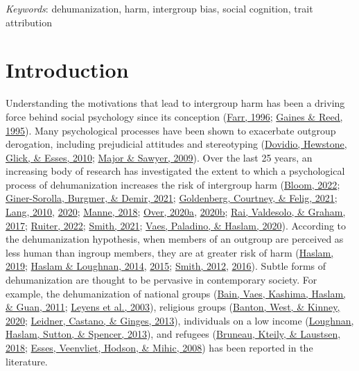 \documentclass[
]{article}
\begin{document}
\emph{Keywords}: dehumanization, harm, intergroup bias, social cognition, trait attribution

\hypertarget{introduction}{%
\section{Introduction}\label{introduction}}

Understanding the motivations that lead to intergroup harm has been a driving force behind social psychology since its conception (\protect\hyperlink{ref-Farr1996}{Farr, 1996}; \protect\hyperlink{ref-Gaines1995}{Gaines \& Reed, 1995}). Many psychological processes have been shown to exacerbate outgroup derogation, including prejudicial attitudes and stereotyping (\protect\hyperlink{ref-Dovidio2010}{Dovidio, Hewstone, Glick, \& Esses, 2010}; \protect\hyperlink{ref-Major2009}{Major \& Sawyer, 2009}). Over the last 25 years, an increasing body of research has investigated the extent to which a psychological process of dehumanization increases the risk of intergroup harm (\protect\hyperlink{ref-Bloom2022}{Bloom, 2022}; \protect\hyperlink{ref-Giner-Sorolla2021}{Giner-Sorolla, Burgmer, \& Demir, 2021}; \protect\hyperlink{ref-Goldenberg2021}{Goldenberg, Courtney, \& Felig, 2021}; \protect\hyperlink{ref-Lang2010}{Lang, 2010}, \protect\hyperlink{ref-Lang2020}{2020}; \protect\hyperlink{ref-Manne2018}{Manne, 2018}; \protect\hyperlink{ref-Over2020a}{Over, 2020a}, \protect\hyperlink{ref-Over2020b}{2020b}; \protect\hyperlink{ref-Rai2017}{Rai, Valdesolo, \& Graham, 2017}; \protect\hyperlink{ref-Ruiter2022}{Ruiter, 2022}; \protect\hyperlink{ref-Smith2021}{Smith, 2021}; \protect\hyperlink{ref-Vaes2020}{Vaes, Paladino, \& Haslam, 2020}). According to the dehumanization hypothesis, when members of an outgroup are perceived as less human than ingroup members, they are at greater risk of harm (\protect\hyperlink{ref-Haslam2019}{Haslam, 2019}; \protect\hyperlink{ref-Haslam2014}{Haslam \& Loughnan, 2014}, \protect\hyperlink{ref-Haslam2015}{2015}; \protect\hyperlink{ref-Smith2011}{Smith, 2012}, \protect\hyperlink{ref-Smith2016}{2016}). Subtle forms of dehumanization are thought to be pervasive in contemporary society. For example, the dehumanization of national groups (\protect\hyperlink{ref-Bain2011}{Bain, Vaes, Kashima, Haslam, \& Guan, 2011}; \protect\hyperlink{ref-Leyens2003}{Leyens et al., 2003}), religious groups (\protect\hyperlink{ref-Banton2020}{Banton, West, \& Kinney, 2020}; \protect\hyperlink{ref-Leidner2013}{Leidner, Castano, \& Ginges, 2013}), individuals on a low income (\protect\hyperlink{ref-Loughnan2013}{Loughnan, Haslam, Sutton, \& Spencer, 2013}), and refugees (\protect\hyperlink{ref-Bruneau2018}{Bruneau, Kteily, \& Laustsen, 2018}; \protect\hyperlink{ref-Esses2008}{Esses, Veenvliet, Hodson, \& Mihic, 2008}) has been reported in the literature.
\end{document}
